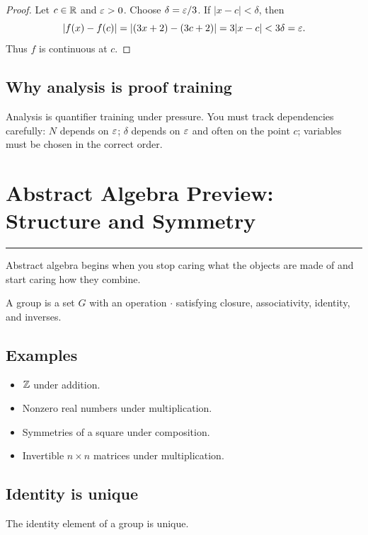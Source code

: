 \documentclass[12pt]{article}
\newcommand{\chapterline}{\vspace{0.4em}\hrule\vspace{0.8em}}
\begin{document}
\begin{proof}
Let $c\in\mathbb{R}$ and $\varepsilon>0$. Choose $\delta=\varepsilon/3$. If $|x-c|<\delta$, then
\[
|f(x)-f(c)|=|(3x+2)-(3c+2)|=3|x-c|<3\delta=\varepsilon.
\]
Thus $f$ is continuous at $c$.
\end{proof}

\subsection{Why analysis is proof training}

Analysis is quantifier training under pressure. You must track dependencies carefully: $N$ depends on $\varepsilon$; $\delta$ depends on $\varepsilon$ and often on the point $c$; variables must be chosen in the correct order.

\newpage
\section{Abstract Algebra Preview: Structure and Symmetry}
\chapterline

Abstract algebra begins when you stop caring what the objects are made of and start caring how they combine.

\begin{definition}
A group is a set $G$ with an operation $\cdot$ satisfying closure, associativity, identity, and inverses.
\end{definition}

\subsection{Examples}

\begin{itemize}
\item $\mathbb{Z}$ under addition.
\item Nonzero real numbers under multiplication.
\item Symmetries of a square under composition.
\item Invertible $n\times n$ matrices under multiplication.
\end{itemize}

\subsection{Identity is unique}

\begin{theorem}
The identity element of a group is unique.
\end{theorem}
\end{document}
